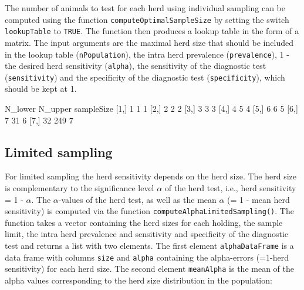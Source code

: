 \documentclass[nojss]{jss}
\begin{document}
The number of animals to test for each herd using individual 
sampling can be computed using the function 
\texttt{computeOptimalSampleSize} by setting the switch 
\texttt{lookupTable} to \texttt{TRUE}. The function then produces a 
lookup table in the form of a matrix. The input arguments are the 
maximal herd size that should be included in the  lookup table 
(\texttt{nPopulation}), the intra herd prevalence 
(\texttt{prevalence}), 1 - the desired herd sensitivity 
(\texttt{alpha}), the sensitivity of the diagnostic test 
(\texttt{sensitivity}) and the specificity of the diagnostic test 
(\texttt{specificity}), which should be kept at 1. 

\begin{Schunk}
\begin{Soutput}
     N_lower N_upper sampleSize
[1,]       1       1          1
[2,]       2       2          2
[3,]       3       3          3
[4,]       4       5          4
[5,]       6       6          5
[6,]       7      31          6
[7,]      32     249          7
\end{Soutput}
\end{Schunk}



\subsection{Limited sampling} \label{subsec:ltd-sampling-noclass}  

For limited sampling the herd sensitivity depends on the herd size. 
The herd size is complementary to the significance level $\alpha$ of 
the herd test, i.e., herd sensitivity = 1 - $\alpha$. The 
$\alpha$-values of the herd test, as well as the mean $\alpha$ (= 1 
- mean herd sensitivity) is computed via the function 
\texttt{computeAlphaLimitedSampling()}. 
 The function takes a 
vector containing the herd sizes for each holding, the sample limit, 
the intra herd prevalence and sensitivity and specificity of the 
diagnostic test and returns a list with two elements. The first 
element \texttt{alphaDataFrame} is a data frame with columns 
\texttt{size} and \texttt{alpha} containing the alpha-errors 
(=1-herd sensitivity) for each herd size. The second element 
\texttt{meanAlpha} is the mean of the alpha values corresponding to 
the herd size distribution in the population: 
\end{document}
